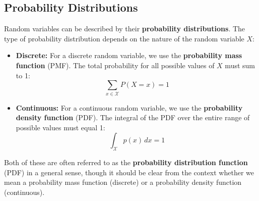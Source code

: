 \vspace{1em}


\subsection{Probability Distributions}

Random variables can be described by their \textbf{probability distributions}. The type of probability distribution depends on the nature of the random variable \(X\):

\begin{itemize}
    \item \textbf{Discrete:} For a discrete random variable, we use the \textbf{probability mass function} (PMF). The total probability for all possible values of \(X\) must sum to 1:
    \[
    \sum_{x \in \mathcal{X}} P(X = x) = 1
    \]
    \item \textbf{Continuous:} For a continuous random variable, we use the \textbf{probability density function} (PDF). The integral of the PDF over the entire range of possible values must equal 1:
    \[
    \int_{\mathcal{X}} p(x) \, dx = 1
    \]
\end{itemize}

Both of these are often referred to as the \textbf{probability distribution function} (PDF) in a general sense, though it should be clear from the context whether we mean a probability mass function (discrete) or a probability density function (continuous).

\vspace{1em}


